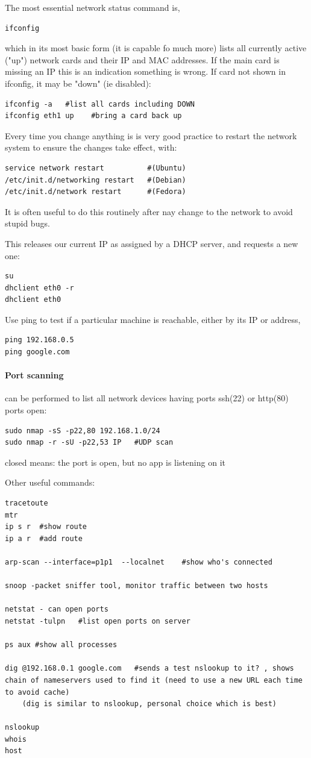 \documentclass[oneside,english]{scrbook}
\begin{document}
The most essential network status command is,
\begin{lstlisting}
ifconfig
\end{lstlisting}
which in its most basic form (it is capable fo much more) lists all currently active ("up") network cards and their IP and MAC addresses.  If the main card is missing an IP this is an indication something is wrong.  If card not shown in ifconfig, it may be "down" (ie disabled): 
\begin{lstlisting}
ifconfig -a   #list all cards including DOWN 
ifconfig eth1 up    #bring a card back up
\end{lstlisting}

Every time you change anything is is very good practice to restart the network system to ensure the changes take effect, with:

\begin{lstlisting}
service network restart			 #(Ubuntu)
/etc/init.d/networking restart   #(Debian)
/etc/init.d/network restart      #(Fedora)
\end{lstlisting}
It is often useful to do this routinely after nay change to the network to avoid stupid bugs.

This releases our current IP as assigned by a DHCP server, and requests a new one:
\begin{lstlisting}
su
dhclient eth0 -r
dhclient eth0
\end{lstlisting}

Use ping to test if a particular machine is reachable, either by its IP or address,
\begin{lstlisting}
ping 192.168.0.5
ping google.com
\end{lstlisting}

\paragraph{Port scanning} can be performed to list all network devices having ports ssh(22) or http(80) ports open:
\begin{lstlisting}
sudo nmap -sS -p22,80 192.168.1.0/24
sudo nmap -r -sU -p22,53 IP   #UDP scan
\end{lstlisting}
closed means: the port is open, but no app is listening on it

Other useful commands:
\begin{lstlisting}
tracetoute
mtr
ip s r  #show route
ip a r  #add route

arp-scan --interface=p1p1  --localnet    #show who's connected

snoop -packet sniffer tool, monitor traffic between two hosts

netstat - can open ports
netstat -tulpn   #list open ports on server

ps aux #show all processes

dig @192.168.0.1 google.com   #sends a test nslookup to it? , shows chain of nameservers used to find it (need to use a new URL each time to avoid cache)
    (dig is similar to nslookup, personal choice which is best)

nslookup
whois
host
\end{lstlisting}
\end{document}
